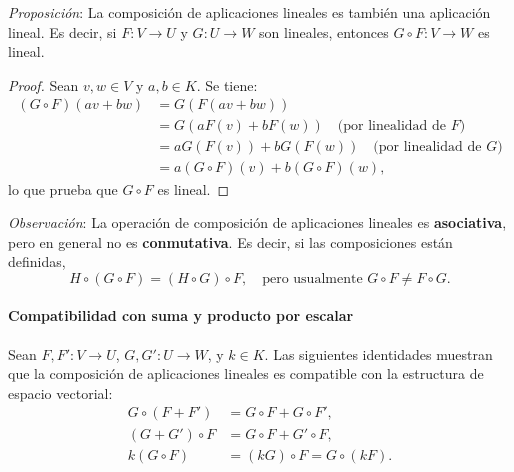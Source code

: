 \begin{center}
\end{center}

\textit{Proposición}: La composición de aplicaciones lineales es también una aplicación lineal. Es decir, si \(F : V \to U\) y \(G : U \to W\) son lineales, entonces \(G \circ F : V \to W\) es lineal.

\begin{proof}
Sean \(v, w \in V\) y \(a, b \in K\). Se tiene:
\begin{align*}
  (G \circ F)(av + bw) &= G(F(av + bw)) \\
                       &= G(aF(v) + bF(w)) \quad \text{(por linealidad de \(F\))} \\
                       &= aG(F(v)) + bG(F(w)) \quad \text{(por linealidad de \(G\))} \\
                       &= a(G \circ F)(v) + b(G \circ F)(w),
\end{align*}
lo que prueba que \(G \circ F\) es lineal.
\end{proof}

\textit{Observación}: La operación de composición de aplicaciones lineales es \textbf{asociativa}, pero en general no es \textbf{conmutativa}. Es decir, si las composiciones están definidas,
\[
  H \circ (G \circ F) = (H \circ G) \circ F, \quad \text{pero usualmente } G \circ F \ne F \circ G.
\]

\paragraph{Compatibilidad con suma y producto por escalar}

Sean \(F, F' : V \to U\), \(G, G' : U \to W\), y \(k \in K\). Las siguientes identidades muestran que la composición de aplicaciones lineales es compatible con la estructura de espacio vectorial:
\begin{align*}
  G \circ (F + F') &= G \circ F + G \circ F', \\
  (G + G') \circ F &= G \circ F + G' \circ F, \\
  k(G \circ F) &= (kG) \circ F = G \circ (kF).
\end{align*}

